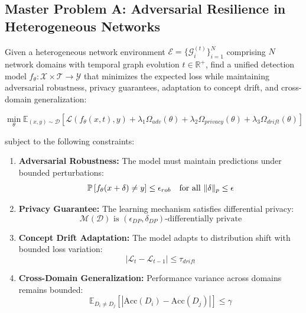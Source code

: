 \subsection*{Master Problem A: Adversarial Resilience in Heterogeneous Networks}

Given a heterogeneous network environment $\mathcal{E} = \{\mathcal{G}^{(t)}_i\}_{i=1}^N$ comprising $N$ network domains with temporal graph evolution $t \in \mathbb{R}^+$, find a unified detection model $f_\theta: \mathcal{X} \times \mathcal{T} \rightarrow \mathcal{Y}$ that minimizes the expected loss while maintaining adversarial robustness, privacy guarantees, adaptation to concept drift, and cross-domain generalization:

\begin{equation}
\min_\theta \mathbb{E}_{(x,y) \sim \mathcal{D}} \left[ \mathcal{L}(f_\theta(x,t), y) + \lambda_1 \Omega_{adv}(\theta) + \lambda_2 \Omega_{privacy}(\theta) + \lambda_3 \Omega_{drift}(\theta) \right]
\end{equation}

subject to the following constraints:

\begin{enumerate}[label=(\roman*), leftmargin=2em]
\item \textbf{Adversarial Robustness:} The model must maintain predictions under bounded perturbations:
\begin{equation}
\mathbb{P}\left[f_\theta(x + \delta) \neq y\right] \leq \epsilon_{rob} \quad \text{for all } \|\delta\|_p \leq \epsilon
\end{equation}

\item \textbf{Privacy Guarantee:} The learning mechanism satisfies differential privacy:
\begin{equation}
\mathcal{M}(\mathcal{D}) \text{ is } (\epsilon_{DP}, \delta_{DP})\text{-differentially private}
\end{equation}

\item \textbf{Concept Drift Adaptation:} The model adapts to distribution shift with bounded loss variation:
\begin{equation}
|\mathcal{L}_t - \mathcal{L}_{t-1}| \leq \tau_{drift}
\end{equation}

\item \textbf{Cross-Domain Generalization:} Performance variance across domains remains bounded:
\begin{equation}
\mathbb{E}_{D_i \neq D_j}\left[|\text{Acc}(D_i) - \text{Acc}(D_j)|\right] \leq \gamma
\end{equation}
\end{enumerate}

